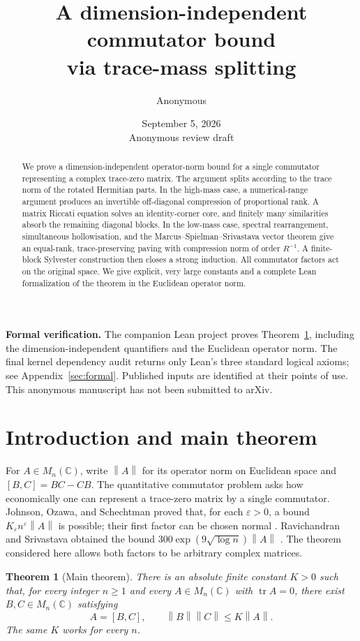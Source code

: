 \documentclass[11pt]{article}
\title{A dimension-independent commutator bound\\via trace-mass splitting}
\author{Anonymous}
\date{September 5, 2026\\\small Anonymous review draft}
\newtheorem{theorem}{Theorem}[section]
\theoremstyle{remark}
\newcommand{\C}{\mathbb C}
\newcommand{\tr}{\operatorname{tr}}
\newcommand{\norm}[1]{\left\lVert#1\right\rVert}
\newcommand{\comm}[2]{[#1,#2]}
\numberwithin{equation}{section}
\begin{document}
\maketitle
\begin{abstract}
We prove a dimension-independent operator-norm bound for a
single commutator representing a complex trace-zero matrix. The argument splits
according to the trace norm of the rotated Hermitian parts. In the high-mass case,
a numerical-range argument produces an invertible off-diagonal compression of
proportional rank. A matrix Riccati equation solves an identity-corner core, and
finitely many similarities absorb the remaining diagonal blocks. In the low-mass
case, spectral rearrangement, simultaneous hollowisation, and the
Marcus--Spielman--Srivastava vector theorem give an equal-rank, trace-preserving
paving with compression norm of order $R^{-1}$. A finite-block Sylvester
construction then closes a strong induction. All commutator factors act on the
original space. We give explicit, very large constants and a complete Lean
formalization of the theorem in the Euclidean operator norm.
\end{abstract}

\noindent\textbf{Formal verification.}
The companion Lean project proves Theorem~\ref{thm:main}, including the
dimension-independent quantifiers and the Euclidean operator norm. The final
kernel dependency audit returns only Lean's three standard logical axioms;
see Appendix~\ref{sec:formal}. Published inputs are identified at their points
of use. This anonymous manuscript has not been submitted to arXiv.

\tableofcontents
\clearpage

\section{Introduction and main theorem}
For $A\in M_n(\C)$, write $\norm A$ for its operator norm on Euclidean space and
$\comm BC=BC-CB$. The quantitative commutator problem asks how economically one
can represent a trace-zero matrix by a single commutator. Johnson, Ozawa, and
Schechtman proved that, for each $\varepsilon>0$, a bound
$K_\varepsilon n^\varepsilon\norm A$ is possible; their first factor can be chosen
normal \cite{JOS}. Ravichandran and Srivastava obtained the bound
$300\exp(9\sqrt{\log n})\norm A$ \cite[Corollary 2]{RS}. The theorem considered here
allows both factors to be arbitrary complex matrices.

\begin{theorem}[Main theorem]\label{thm:main}
There is an absolute finite constant $K>0$ such that, for every integer $n\ge1$
and every $A\in M_n(\C)$ with $\tr A=0$, there exist $B,C\in M_n(\C)$ satisfying
\begin{equation}\label{eq:main}
 A=\comm BC,\qquad \norm B\norm C\le K\norm A.
\end{equation}
The same $K$ works for every $n$.
\end{theorem}
\end{document}
